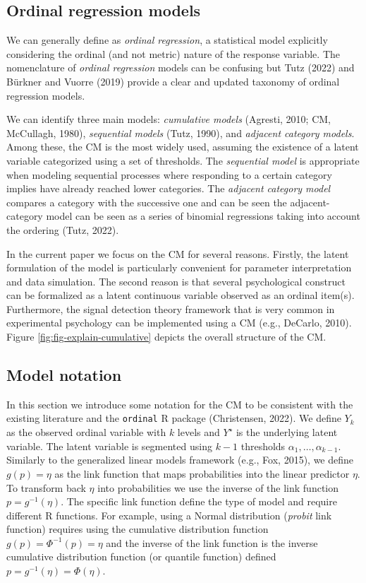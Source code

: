 \documentclass[
  man,floatsintext]{apa6}
\begin{document}
\normalsize

\subsection{Ordinal regression models}\label{ordinal-regression-models}

We can generally define as \emph{ordinal regression}, a statistical model explicitly considering the ordinal (and not metric) nature of the response variable. The nomenclature of \emph{ordinal regression} models can be confusing but Tutz (2022) and Bürkner and Vuorre (2019) provide a clear and updated taxonomy of ordinal regression models.

We can identify three main models: \emph{cumulative models} (Agresti, 2010; CM, McCullagh, 1980), \emph{sequential models} (Tutz, 1990), and \emph{adjacent category models}. Among these, the CM is the most widely used, assuming the existence of a latent variable categorized using a set of thresholds. The \emph{sequential model} is appropriate when modeling sequential processes where responding to a certain category implies have already reached lower categories. The \emph{adjacent category model} compares a category with the successive one and can be seen the adjacent-category model can be seen as a series of binomial regressions taking into account the ordering (Tutz, 2022).

In the current paper we focus on the CM for several reasons. Firstly, the latent formulation of the model is particularly convenient for parameter interpretation and data simulation. The second reason is that several psychological construct can be formalized as a latent continuous variable observed as an ordinal item(s). Furthermore, the signal detection theory framework that is very common in experimental psychology can be implemented using a CM (e.g., DeCarlo, 2010). Figure \ref{fig:fig-explain-cumulative} depicts the overall structure of the CM.

\subsection{Model notation}\label{model-notation}

In this section we introduce some notation for the CM to be consistent with the existing literature and the \texttt{ordinal} R package (Christensen, 2022). We define \(Y_k\) as the observed ordinal variable with \(k\) levels and \(Y^\star\) is the underlying latent variable. The latent variable is segmented using \(k - 1\) thresholds \(\alpha_1, \dots, \alpha_{k - 1}\). Similarly to the generalized linear models framework (e.g., Fox, 2015), we define \(g(p) = \eta\) as the link function that maps probabilities into the linear predictor \(\eta\). To transform back \(\eta\) into probabilities we use the inverse of the link function \(p = g^{-1}(\eta)\). The specific link function define the type of model and require different R functions. For example, using a Normal distribution (\emph{probit} link function) requires using the cumulative distribution function \(g(p) = \Phi^{-1}(p) = \eta\) and the inverse of the link function is the inverse cumulative distribution function (or quantile function) defined \(p = g^{-1}(\eta) = \Phi(\eta)\).
\end{document}
